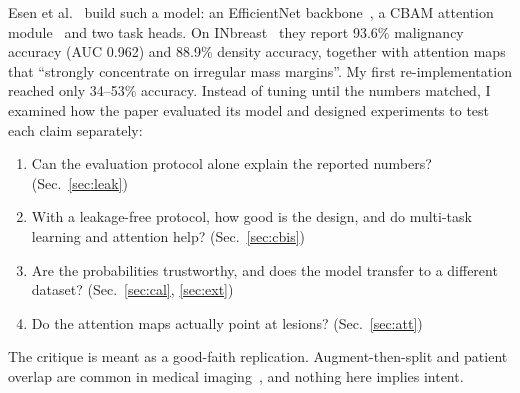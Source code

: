 \documentclass[10pt,a4paper]{article}
\begin{document}
Esen et al.~\cite{esen2025} build such a model: an EfficientNet backbone~\cite{tan2019}, a CBAM attention
module~\cite{woo2018} and two task heads. On INbreast~\cite{moreira2012} they report 93.6\% malignancy accuracy (AUC
0.962) and 88.9\% density accuracy, together with attention maps that ``strongly concentrate on irregular mass margins''.
My first re-implementation reached only 34--53\% accuracy. Instead of tuning until the numbers matched, I
examined how the paper evaluated its model and designed experiments to test each claim separately:
\begin{enumerate}[label=\textbf{Q\arabic*}]
\item Can the evaluation protocol alone explain the reported numbers? (Sec.~\ref{sec:leak})
\item With a leakage-free protocol, how good is the design, and do multi-task learning and attention help? (Sec.~\ref{sec:cbis})
\item Are the probabilities trustworthy, and does the model transfer to a different dataset? (Sec.~\ref{sec:cal}, \ref{sec:ext})
\item Do the attention maps actually point at lesions? (Sec.~\ref{sec:att})
\end{enumerate}
The critique is meant as a good-faith replication. Augment-then-split and patient overlap are common in medical
imaging~\cite{roberts2021,kapoor2023}, and nothing here implies intent.
\end{document}
